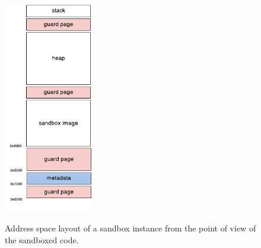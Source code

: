 \documentclass[a4paper,12pt,twoside,openright]{report}
\begin{document}

\begin{figure}
	\centering
	\includegraphics[width=0.35\textwidth]{dia_address_layout.pdf}
	\label{fig:AddressSpaceLayout}
	\caption{Address space layout of a sandbox instance from the point of view of the sandboxed code.}
\end{figure}
\end{document}
